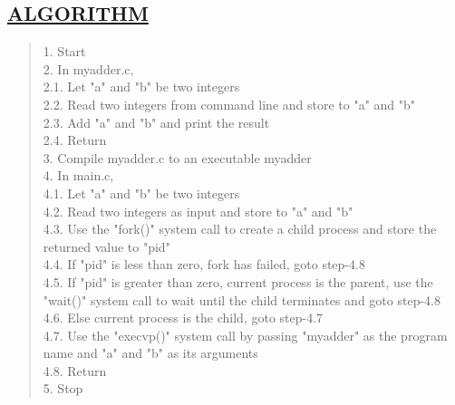\documentclass[a4paper, 12pt]{article}
\begin{document}
\subsection*{\underline{ALGORITHM}}
\begin{quote}
1. Start\\
2. In myadder.c,\\
\hspace*{1cm} 2.1. Let "a" and "b" be two integers\\
\hspace*{1cm} 2.2. Read two integers from command line and store to "a" and "b"\\
\hspace*{1cm} 2.3. Add "a" and "b" and print the result\\
\hspace*{1cm} 2.4. Return\\
3. Compile myadder.c to an executable myadder\\
4. In main.c,\\
\hspace*{1cm} 4.1. Let "a" and "b" be two integers\\
\hspace*{1cm} 4.2. Read two integers as input and store to "a" and "b"\\
\hspace*{1cm} 4.3. Use the "fork()" system call to create a child process and store the returned  \hspace*{2cm}value to "pid"\\
\hspace*{1cm} 4.4. If "pid" is less than zero, fork has failed, goto step-4.8\\
\hspace*{1cm} 4.5. If "pid" is greater than zero, current process is the parent, use the "wait()" \hspace*{2cm} system call to wait until the child terminates and goto step-4.8\\
\hspace*{1cm} 4.6. Else current process is the child, goto step-4.7\\
\hspace*{1cm} 4.7. Use the "execvp()" system call by passing "myadder" as the program name \hspace*{2cm} and "a" and "b" as its arguments\\
\hspace*{1cm} 4.8. Return\\
5. Stop\\
\end{quote}
\end{document}

